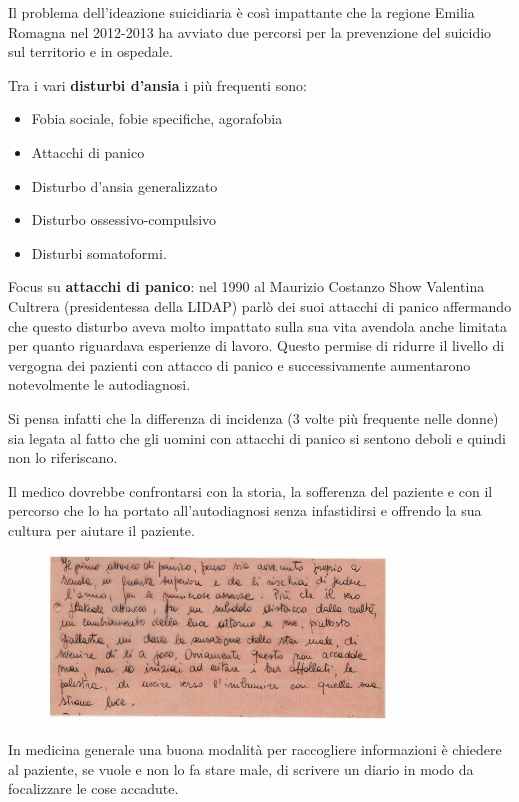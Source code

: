 Il problema dell'ideazione suicidiaria è così impattante che la regione
Emilia Romagna nel 2012-2013 ha avviato due percorsi per la prevenzione
del suicidio sul territorio e in ospedale.

Tra i vari \textbf{disturbi d'ansia} i più frequenti sono:

\begin{itemize}
\item
  Fobia sociale, fobie specifiche, agorafobia
\item
  Attacchi di panico
\item
  Disturbo d'ansia generalizzato
\item
  Disturbo ossessivo-compulsivo
\item
  Disturbi somatoformi.
\end{itemize}

Focus su \textbf{attacchi di panico}: nel 1990 al Maurizio Costanzo Show
Valentina Cultrera (presidentessa della LIDAP) parlò dei suoi attacchi
di panico affermando che questo disturbo aveva molto impattato sulla sua
vita avendola anche limitata per quanto riguardava esperienze di lavoro.
Questo permise di ridurre il livello di vergogna dei pazienti con
attacco di panico e successivamente aumentarono notevolmente le
autodiagnosi.

Si pensa infatti che la differenza di incidenza (3 volte più frequente
nelle donne) sia legata al fatto che gli uomini con attacchi di panico
si sentono deboli e quindi non lo riferiscano.

Il medico dovrebbe confrontarsi con la storia, la sofferenza del
paziente e con il percorso che lo ha portato all'autodiagnosi senza
infastidirsi e offrendo la sua cultura per aiutare il paziente.

\begin{figure}[!ht]
\centering
	\includegraphics[width=0.8\textwidth]{42/image3.jpeg}
	\end{figure}
	
In
medicina generale una buona modalità per raccogliere informazioni è
chiedere al paziente, se vuole e non lo fa stare male, di scrivere un
diario in modo da focalizzare le cose accadute.

